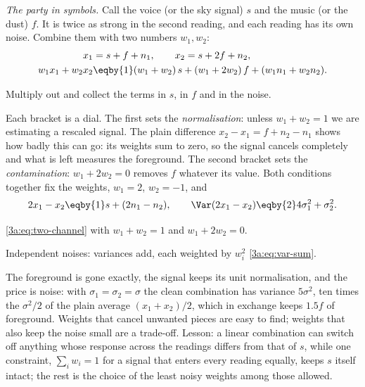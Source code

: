 \emph{The party in symbols.} Call the voice (or the sky signal) $s$ and the
music (or the dust) $f$. It is twice as strong in the second reading, and
each reading has its own noise. Combine them with two numbers $w_1,w_2$:
\begin{align}
  x_1&=s+f+n_1,\qquad x_2=s+2f+n_2,\notag\\
  w_1x_1+w_2x_2&\eqby{1}(w_1+w_2)\,s+(w_1+2w_2)\,f+(w_1n_1+w_2n_2).
  \label{3a:eq:two-channel}
\end{align}
\begin{explain}
  \item Multiply out and collect the terms in $s$, in $f$ and in the noise.
\end{explain}
Each bracket is a dial. The first sets the \emph{normalisation}: unless
$w_1+w_2=1$ we are estimating a rescaled signal. The plain difference
$x_2-x_1=f+n_2-n_1$ shows how badly this can go: its weights sum to zero,
so the signal cancels completely and what is left measures the foreground.
The second bracket sets the \emph{contamination}: $w_1+2w_2=0$ removes $f$
whatever its value. Both conditions together fix the weights,
$w_1=2$, $w_2=-1$, and
\begin{equation}
  2x_1-x_2 \eqby{1} s+(2n_1-n_2),\qquad
  \Var(2x_1-x_2)\eqby{2}4\sigma_1^2+\sigma_2^2 .
  \label{3a:eq:two-channel-clean}
\end{equation}
\begin{explain}
  \item \eqref{3a:eq:two-channel} with $w_1+w_2=1$ and $w_1+2w_2=0$.
  \item Independent noises: variances add, each weighted by $w_i^2$
        \eqref{3a:eq:var-sum}.
\end{explain}
The foreground is gone exactly, the signal keeps its unit normalisation, and
the price is noise: with $\sigma_1=\sigma_2=\sigma$ the clean combination has
variance $5\sigma^2$, ten times the $\sigma^2/2$ of the plain average
$(x_1+x_2)/2$, which in exchange keeps $1.5f$ of foreground. Weights that
cancel unwanted pieces are easy to find; weights that also keep the noise
small are a trade-off. Lesson: a linear combination can switch off anything
whose response across the readings differs from that of $s$, while one
constraint, $\sum_iw_i=1$ for a signal that enters every reading equally,
keeps $s$ itself intact; the rest is the choice of the least noisy weights
among those allowed.

